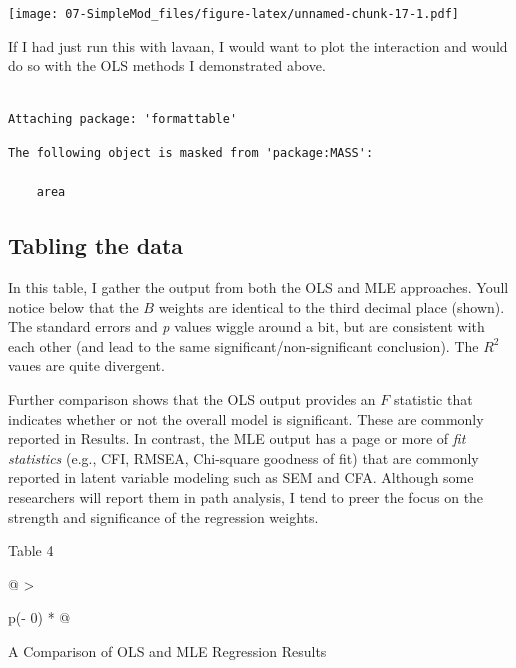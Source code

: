 \documentclass[
  11pt,
]{book}
\begin{document}
\texttt{[image: 07-SimpleMod\_files/figure-latex/unnamed-chunk-17-1.pdf]}

If I had just run this with lavaan, I would want to plot the interaction and would do so with the OLS methods I demonstrated above.

\begin{verbatim}

Attaching package: 'formattable'
\end{verbatim}

\begin{verbatim}
The following object is masked from 'package:MASS':

    area
\end{verbatim}

\hypertarget{tabling-the-data}{%
\subsection{Tabling the data}\label{tabling-the-data}}

In this table, I gather the output from both the OLS and MLE approaches. Youll notice below that the \(B\) weights are identical to the third decimal place (shown). The standard errors and \emph{p} values wiggle around a bit, but are consistent with each other (and lead to the same significant/non-significant conclusion). The \(R^2\) vaues are quite divergent.

Further comparison shows that the OLS output provides an \(F\) statistic that indicates whether or not the overall model is significant. These are commonly reported in Results. In contrast, the MLE output has a page or more of \emph{fit statistics} (e.g., CFI, RMSEA, Chi-square goodness of fit) that are commonly reported in latent variable modeling such as SEM and CFA. Although some researchers will report them in path analysis, I tend to preer the focus on the strength and significance of the regression weights.

Table 4

\begin{longtable}[]{@{}
  >{\raggedright\arraybackslash}p{(\columnwidth - 0\tabcolsep) * }@{}}
\toprule\noalign{}
\begin{minipage}[b]{\linewidth}\raggedright
A Comparison of OLS and MLE Regression Results
\end{minipage} \\
\midrule\noalign{}
\endhead
\bottomrule\noalign{}
\endlastfoot
\end{longtable}
\end{document}
